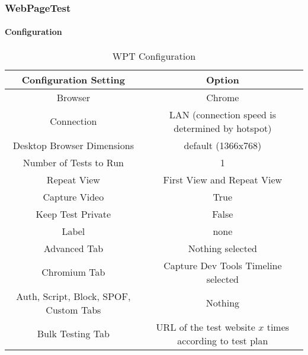 


\subsubsection{WebPageTest}





\paragraph{Configuration}





\begin{table}[h]
	\small
	\centering
	\begin{tabular}{  | c | c | } 
	\hline
	\cellcolor{lightgrey} Configuration Setting & \cellcolor{lightgrey} Option \\
	\hline
	Browser & Chrome \\
	\hline
	Connection & LAN (connection speed is determined by hotspot) \\
	Desktop Browser Dimensions & default (1366x768) \\
	Number of Tests to Run & 1 \\
	Repeat View & First View and Repeat View \\
	Capture Video & True \\
	Keep Test Private & False \\
	Label & none \\
	\hline	  
	Advanced Tab & Nothing selected \\
	Chromium Tab & Capture Dev Tools Timeline selected  \\
	Auth, Script, Block, SPOF, Custom Tabs & Nothing  \\
	Bulk Testing Tab & URL of the test website $x$ times according to test plan \\
	\hline
	\end{tabular}
	\medskip
	\caption{WPT Configuration}
	\label{table:wpt_configuration}
\end{table}



